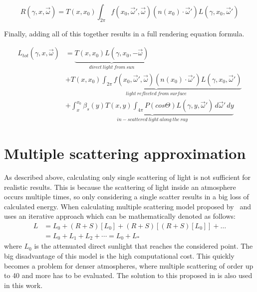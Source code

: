 \documentclass{ctuthesis}
\begin{document}
\begin{equation}
    R(\gamma, x, \overrightarrow{\omega}) = T(x, x_{0}) \int_{2 \pi} f(x_{0}, \overrightarrow{\omega}',\overrightarrow{\omega}) (n(x_{0}) \cdot \overrightarrow{\omega}') L(\gamma, x_{0},\overrightarrow{\omega}')
\end{equation}

Finally, adding all of this together results in a full rendering equation formula. 

\begin{equation}
\begin{split}
\label{eq:complete rendering equation}
    L_{tot}(\gamma, x, \overrightarrow{\omega}) & = \underbrace{T(x, x_{0}) L(\gamma ,x_{0}, -\overrightarrow{\omega})}_{direct\ light\ from\ sun} \\
    & +\underbrace{T(x, x_{0}) \int_{2 \pi} f(x_{0}, \overrightarrow{\omega}',\overrightarrow{\omega}) (n(x_{0}) \cdot \overrightarrow{\omega}') L(\gamma, x_{0},\overrightarrow{\omega}')}_{light\ reflected\ from\ surface} \\
    & + \underbrace{ \int_{x}^{x_{0}} \beta_{s}(y) T(x,y)  \int_{4 \pi} P( cos \Theta)  L (\gamma, y, \overrightarrow{\omega}') \,d\overrightarrow{\omega}' \,dy}_{in-scattered\ light\ along\ the\ ray}
    \end{split}
\end{equation}

\hfill

\section{Multiple scattering approximation}\label{multiscatt approx}

As described above, calculating only single scattering of light is not sufficient for realistic results.
This is because the scattering of light inside an atmosphere occurs multiple times, so only 
considering a single scatter results in a big loss of calculated energy. When calculating multiple
scattering model proposed by~\cite{costa_bock_emmart_hansen_ynnerman_silva_2021}
and~\cite{bruneton_neyret_2008} uses an iterative approach which can be mathematically denoted as follows:
\begin{equation}
\begin{split}
    L & = L_{0} + (R + S)[L_{0}] + (R + S)[(R + S)[L_{0}]] + \dots \\
    & = L_{0} + L_{1} + L_{2} + \cdots = L_{0} + L_{*}
\end{split}
\end{equation}
where $L_{0}$ is the attenuated direct sunlight that reaches the considered point. 
The big disadvantage of this model is the high computational cost. This quickly becomes a problem 
for denser atmospheres, where multiple scattering of order up to 40 and more has to be evaluated.
The solution to this proposed in \cite{hillaire_2020} is also used in this work. 
\end{document}
